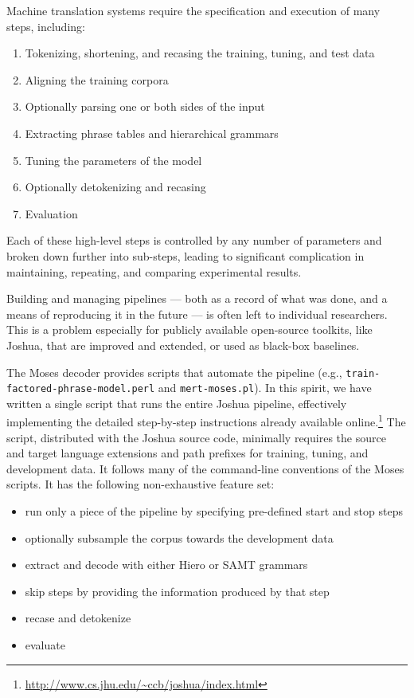 \documentclass[11pt]{article}
\begin{document}
Machine translation systems require the specification and execution of
many steps, including:

\begin{enumerate}
\item Tokenizing, shortening, and recasing the training, tuning, and test data
\item Aligning the training corpora
\item Optionally parsing one or both sides of the input
\item Extracting phrase tables and hierarchical grammars
\item Tuning the parameters of the model
\item Optionally detokenizing and recasing
\item Evaluation
\end{enumerate}

\noindent Each of these high-level steps is controlled by any number
of parameters and broken down further into sub-steps, leading to
significant complication in maintaining, repeating, and comparing
experimental results.

Building and managing pipelines --- both as a record of what was done,
and a means of reproducing it in the future --- is often left to individual
researchers.  This is a problem especially for publicly available open-source
toolkits, like Joshua, that are improved and extended, or used as
black-box baselines.

The Moses decoder provides scripts that automate the pipeline
(e.g., \verb|train-factored-phrase-model.perl| and \verb|mert-moses.pl|).
In this spirit, we have written a single script that runs the entire
Joshua pipeline, effectively implementing the detailed step-by-step
instructions already available
online.\footnote{\url{http://www.cs.jhu.edu/~ccb/joshua/index.html}}
The script, distributed with the Joshua source code, minimally
requires the source and target language extensions and path prefixes
for training, tuning, and development data.  It follows many of the
command-line conventions of the Moses scripts.  It has the following
non-exhaustive feature set:

\begin{itemize}
\item run only a piece of the pipeline by specifying pre-defined start
  and stop steps
\item optionally subsample the corpus towards the development data
\item extract and decode with either Hiero or SAMT grammars
\item skip steps by providing the information produced by that
  step
\item recase and detokenize
\item evaluate
\end{itemize}
\end{document}
